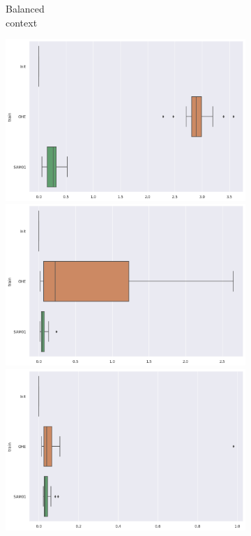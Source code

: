 \documentclass{article}
\theoremstyle{definition}
\begin{document}
\begin{figure}[ht]
\begin{subfigure}[b]{0.15\textwidth}
         \caption{Balanced \\ context}
         \label{Boxplots_Corr_Xhat_Bal}
     \end{subfigure}
     \begin{subfigure}[b]{0.15\textwidth}
         \centering
         \includegraphics[width=\textwidth]{imgs/Illu/1000Epochs/Majo/Boxplots_Corr_Xhat.png}
         \quad
         \includegraphics[width=\textwidth]{imgs/Illu/2000Epochs/Majo/Boxplots_Corr_Xhat.png}
         \quad
         \includegraphics[width=\textwidth]{imgs/Illu/3000Epochs/Majo/Boxplots_Corr_Xhat.png}

\end{subfigure}
\end{figure}
\end{document}
